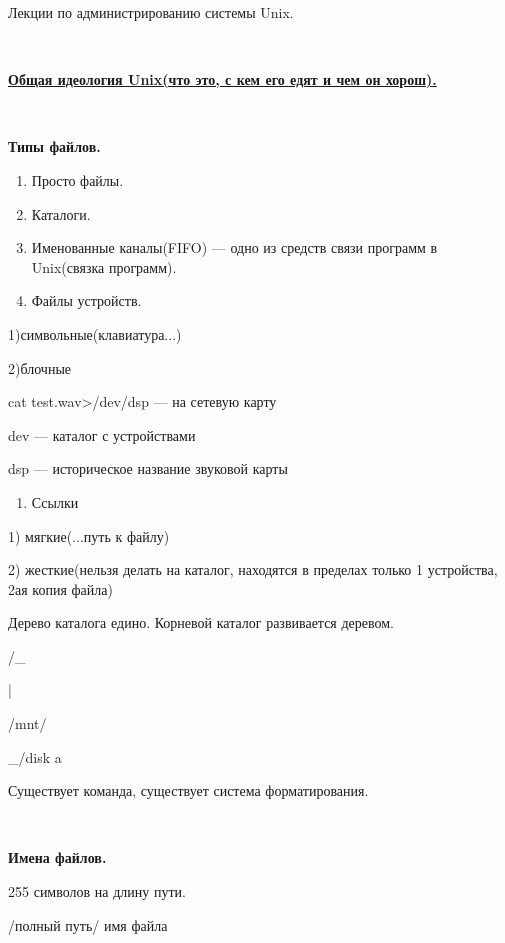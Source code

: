 \par Лекции по администрированию системы Unix.
\par \\

\par \underline{\textbf{Общая
идеология Unix(что это, с кем его едят и
чем он хорош).}}
\par \\

\par \textbf{Типы
файлов.}
\begin{enumerate}
	\item \par Просто
	файлы.
	\item \par Каталоги.
	\item \par Именованные
	каналы(FIFO) — одно из средств связи
	программ в Unix(связка программ).
	\item \par Файлы
	устройств.
\end{enumerate}
\par 
1)символьные(клавиатура...)
\par 
2)блочные
\par  cat
test.wav>/dev/dsp — на сетевую карту
\par  dev —
каталог с устройствами
\par  dsp —
историческое название звуковой карты
\begin{enumerate}
	\item \par Ссылки
\end{enumerate}
\par 
1) мягкие(...путь к файлу)
\par 
2) жесткие(нельзя делать на каталог,
находятся в пределах только 1 устройства,
2ая копия файла)
\par  Дерево
каталога едино. Корневой каталог
развивается деревом.
\par   /\_
\par     |
\par     /mnt/
\par            
\_/disk a
\par  Существует
команда, существует система форматирования.
\par \\

\par \textbf{Имена
файлов.}
\par 255 символов
на длину пути.
\par  /полный
путь/ имя файла
\par \\

